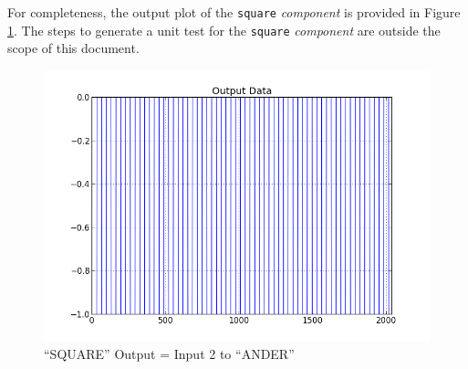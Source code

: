 For completeness, the output plot of the \verb+square+ \textit{component} is provided in Figure \ref{fig:square_pulse}. The steps to generate a unit test for the \verb+square+ \textit{component} are outside the scope of this document.

        \begin{figure}[h]
                \centering
                \includegraphics[scale=0.5]{./figures/square_pulse.jpg}
                \caption{``SQUARE'' Output = Input 2 to ``ANDER''}
                \label{fig:square_pulse}
        \end{figure}




